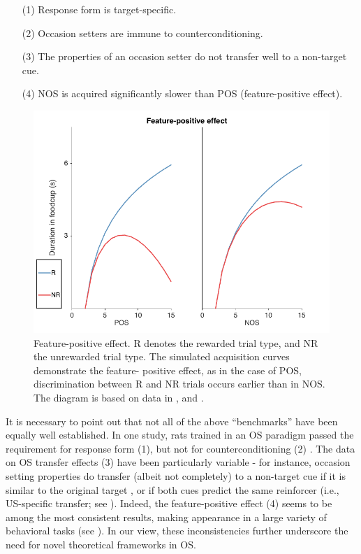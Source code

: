 \documentclass[11pt]{article}
\let\cite=\citep
\let\citeN=\citet
\let\citeNP=\citealt
\begin{document}
\begin{enumerate}
   \item[(1)] Response form is target-specific.
   \item[(2)] Occasion setters are immune to counterconditioning.
   \item[(3)] The properties of an occasion setter do not transfer well to a 
   non-target cue.
   \item[(4)] NOS is acquired significantly slower than POS (feature-positive 
   effect).
\end{enumerate}

\begin{figure}[h]
\centering
\includegraphics[width=\textwidth]{Figures/Fig2}
\caption{Feature-positive effect. R denotes the rewarded trial type, and NR the 
unrewarded trial type. The simulated acquisition curves demonstrate the feature-
positive effect, as in the case of POS, discrimination between R and NR trials 
occurs earlier than in NOS. The diagram is based on data in \citeN{Holland1999}, 
and \citeN{Bouton2011}.}
\label{fig:FPeffect}
\end{figure}

It is necessary to point out that not all of the above ``benchmarks'' have been 
equally well established. In one study, rats trained in an OS paradigm passed 
the requirement for response form (1), but not for counterconditioning (2) 
\cite{Moreira2003}. The data on OS transfer effects (3) have been particularly 
variable - for instance, occasion setting properties do transfer (albeit not 
completely) to a non-target cue if it is similar to the original target 
\cite{Swartzentruber1995}, or if both cues predict the same reinforcer (i.e., 
US-specific transfer; see \citeNP{Bonardi2012,Bonardi2017}). Indeed, the 
feature-positive effect (4) seems to be among the most consistent results, 
making appearance in a large variety of behavioral tasks (see 
\citeNP{Jenkins1970,Bouton2011,Bouton2012,Holland1999}). In our view, these 
inconsistencies further underscore the need for novel theoretical 
frameworks in OS. 
\end{document}
